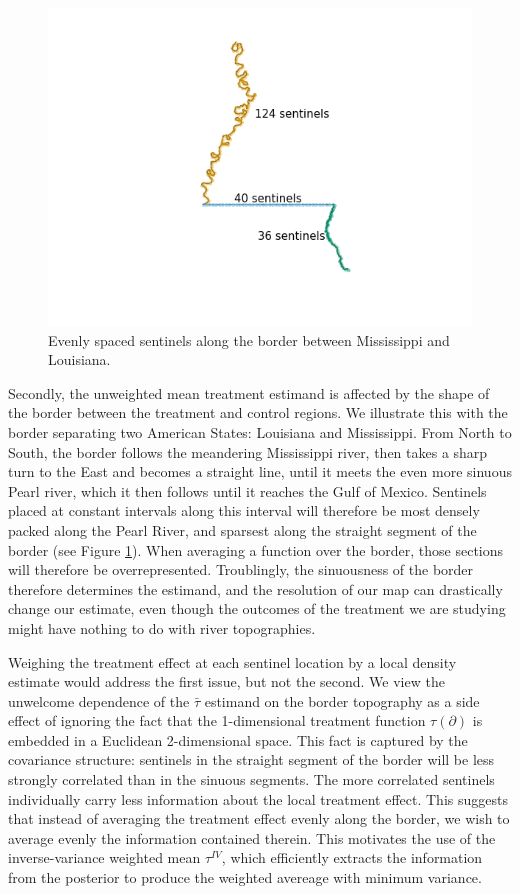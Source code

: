 \documentclass[letter]{article}
\makeatletter
\def\maxwidth{\ifdim\Gin@nat@width>\linewidth\linewidth
\else\Gin@nat@width\fi}
\let\Oldincludegraphics\includegraphics
\renewcommand{\includegraphics}[1]{\Oldincludegraphics[width=.8\maxwidth]{#1}}
\newcommand{\boundary}{\partial}
\newcommand{\linavg}{\bar{\tau}}
\newcommand{\invvar}{\tau^{IV}}
\makeatother
\begin{document}
\begin{figure}
\centering
\includegraphics{figures/mississippi_counts.png}
\caption{\label{fig:mississippi_counts} Evenly spaced sentinels along the border between Mississippi and Louisiana.}
\end{figure}

Secondly, the unweighted mean treatment estimand is affected by the shape of the border between the treatment and control regions.
We illustrate this with the border separating two American States: Louisiana and Mississippi.
From North to South, the border follows the meandering Mississippi river, then takes a sharp turn to the East and becomes a straight line, until it meets the even more sinuous Pearl river, which it then follows until it reaches the Gulf of Mexico.
Sentinels placed at constant intervals along this interval will therefore be most densely packed along the Pearl River, and sparsest along the straight segment of the border (see Figure \ref{fig:mississippi_counts}).
When averaging a function over the border, those sections will therefore be overrepresented.
Troublingly, the sinuousness of the border therefore determines the estimand, and the resolution of our map can drastically change our estimate, even though the outcomes of the treatment we are studying might have nothing to do with river topographies.

Weighing the treatment effect at each sentinel location by a local density estimate would address the first issue, but not the second.
We view the unwelcome dependence of the \(\linavg\) estimand on the border topography as a side effect of ignoring the fact that the 1-dimensional treatment function \(\tau(\boundary)\) is embedded in a Euclidean 2-dimensional space.
This fact is captured by the covariance structure: sentinels in the straight segment of the border will be less strongly correlated than in the sinuous segments.
The more correlated sentinels individually carry less information about the local treatment effect.
This suggests that instead of averaging the treatment effect evenly along the border, we wish to average evenly the information contained therein.
This motivates the use of the inverse-variance weighted mean \(\invvar\), which efficiently extracts the information from the posterior to produce the weighted avereage with minimum variance.
\end{document}
